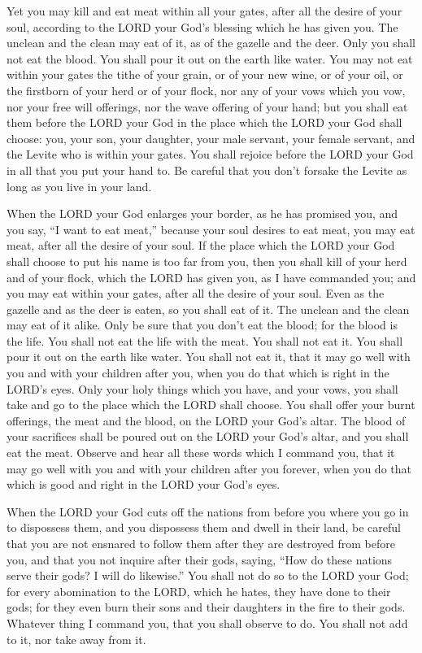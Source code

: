 \myverse{}Yet you may kill and eat meat within all your gates, after all
the desire of your soul, according to the LORD your God’s blessing which he has given you. The unclean
and the clean may eat of it, as of the gazelle and the deer.
\myverse{}Only you shall not eat the blood. You shall pour it out on the earth like
water.
\myverse{}You may not eat within your gates the tithe of your grain, or of your new
wine, or of your oil, or the firstborn of your herd or of your flock, nor any of your vows which you vow,
nor your free will offerings, nor the wave offering of your hand;
\myverse{}but you shall eat them before the LORD your God in the place which the LORD
your God shall choose: you, your son, your daughter, your male servant, your female servant, and the Levite
who is within your gates. You shall rejoice before the LORD your God in all that you put your hand to.
\myverse{}Be careful that you don’t forsake the Levite as long as you live in your
land.


\myverse{}When the LORD your God enlarges your border, as he has promised
you, and you say, “I want to eat meat,” because your soul desires to eat meat, you may eat meat, after
all the desire of your soul.
\myverse{}If the place which the LORD your God shall choose to put his name is too
far from you, then you shall kill of your herd and of your flock, which the LORD has given you, as I have
commanded you; and you may eat within your gates, after all the desire of your soul.
\myverse{}Even as the gazelle and as the deer is eaten, so you shall eat of it. The
unclean and the clean may eat of it alike.
\myverse{}Only be sure that you don’t eat the blood; for the blood is the life. You
shall not eat the life with the meat.
\myverse{}You shall not eat it. You shall pour it out on the earth like water.
\myverse{}You shall not eat it, that it may go well with you and with your children
after you, when you do that which is right in the LORD’s eyes.
\myverse{}Only your holy things which you have, and your vows, you shall take and go
to the place which the LORD shall choose.
\myverse{}You shall offer your burnt offerings, the meat and the blood, on the LORD
your God’s altar. The blood of your sacrifices shall be poured out on the LORD your God’s altar, and you
shall eat the meat.
\myverse{}Observe and hear all these words which I command you, that it may go well
with you and with your children after you forever, when you do that which is good and right in the LORD
your God’s eyes.


\myverse{}When the LORD your God cuts off the nations from before you
where you go in to dispossess them, and you dispossess them and dwell in their land,
\myverse{}be careful that you are not ensnared to follow them after they are destroyed
from before you, and that you not inquire after their gods, saying, “How do these nations serve their
gods? I will do likewise.”
\myverse{}You shall not do so to the LORD your God; for every abomination to the LORD,
which he hates, they have done to their gods; for they even burn their sons and their daughters in the
fire to their gods.
\myverse{}Whatever thing I command you, that you shall observe to do. You shall not
add to it, nor take away from it.


